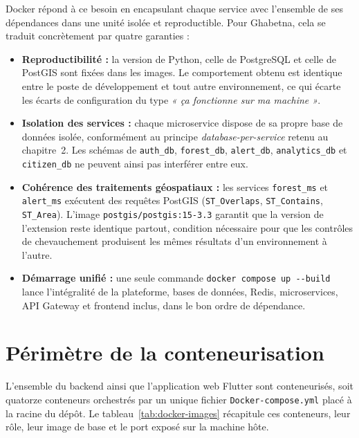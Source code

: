 Docker répond à ce besoin en encapsulant chaque service avec l'ensemble de
ses dépendances dans une unité isolée et reproductible. Pour Ghabetna, cela
se traduit concrètement par quatre garanties :

\begin{itemize}
  \item \textbf{Reproductibilité :} la version de Python, celle de PostgreSQL
        et celle de PostGIS sont fixées dans les images. Le comportement
        obtenu est identique entre le poste de développement et tout autre
        environnement, ce qui écarte les écarts de configuration du type
        \textit{« ça fonctionne sur ma machine »}.

  \item \textbf{Isolation des services :} chaque microservice dispose de sa
        propre base de données isolée, conformément au principe
        \textit{database-per-service} retenu au chapitre~2. Les schémas de
        \texttt{auth\_db}, \texttt{forest\_db}, \texttt{alert\_db},
        \texttt{analytics\_db} et \texttt{citizen\_db} ne peuvent ainsi pas
        interférer entre eux.

  \item \textbf{Cohérence des traitements géospatiaux :} les services
        \texttt{forest\_ms} et \texttt{alert\_ms} exécutent des requêtes
        PostGIS (\texttt{ST\_Overlaps}, \texttt{ST\_Contains},
        \texttt{ST\_Area}). L'image \texttt{postgis/postgis:15-3.3} garantit
        que la version de l'extension reste identique partout, condition
        nécessaire pour que les contrôles de chevauchement produisent les
        mêmes résultats d'un environnement à l'autre.

  \item \textbf{Démarrage unifié :} une seule commande
        \texttt{docker compose up -{}-build} lance l'intégralité de la
        plateforme, bases de données, Redis, microservices, API Gateway et
        frontend inclus, dans le bon ordre de dépendance.
\end{itemize}

\section*{Périmètre de la conteneurisation}

L'ensemble du backend ainsi que l'application web Flutter sont conteneurisés,
soit quatorze conteneurs orchestrés par un unique fichier
\texttt{Docker-compose.yml} placé à la racine du dépôt. Le
tableau~\ref{tab:docker-images} récapitule ces conteneurs, leur rôle, leur
image de base et le port exposé sur la machine hôte.

